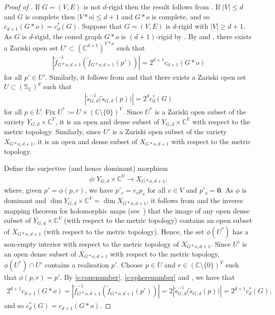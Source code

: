 \begin{proof}[Proof of ]
	If $G=(V,E)$ is not $d$-rigid then the result follows from .
	If $|V| \leq d$ and $G$ is complete then $|V*o| \leq d+1$ and $G*o$ is complete,
	and so $c_{d+1}(G*o) = c^*_d(G)$.
	Suppose that $G=(V,E)$ is $d$-rigid with $|V| \geq d+1$.	
	As $G$ is $d$-rigid, the coned graph $G*o$ is $(d+1)$-rigid by .
	By  and ,
	there exists a Zariski open set $U' \subset (\mathbb{C}^{d+1})^{V*o}$ such that
	\begin{align}\label{e:conenumber}
		\left| \tilde{f}_{G*o,d+1}^{-1} \left(\tilde{f}_{G*o,d+1}(p') \right) \right| = 2^{d+1} c_{d+1}(G*o)
	\end{align}
	for all $p' \in U'$.
	Similarly, it follows from  and  that there exists a Zariski open set $U \subset (\mathbb{S}_\mathbb{C})^{d}$ such that
	\begin{align}\label{e:spherenumber}
		\left| \tilde{s}_{G,d}^{-1} \Big(\tilde{s}_{G,d}(p) \Big) \right| = 2^{d} c_{d}^*(G)
	\end{align}
	for all $p \in U$.
	Fix $U^* := U \times (\mathbb{C} \setminus \{0\})^V$.
	Since $U^*$ is a Zariski open subset of the variety $Y_{G,d} \times \mathbb{C}^V$,
	it is an open and dense subset of $Y_{G,d} \times \mathbb{C}^V$ with respect to the metric topology.
	Similarly,
	since $U'$ is a Zariski open subset of the variety $ X_{G *o,d+1}$,
	it is an open and dense subset of $X_{G *o,d+1}$ with respect to the metric topology.
	
	Define the surjective (and hence dominant) morphism 
	\begin{align*}
		\phi : Y_{G,d} \times \mathbb{C}^V \rightarrow X_{G *o,d+1},
	\end{align*}
	where, given $p'= \phi(p,r)$,
	we have $p'_v=r_vp_v$ for all $v \in V$ and $p'_o=\mathbf{0}$.
	As $\phi$ is dominant and $\dim Y_{G,d} \times \mathbb{C}^V = \dim X_{G *o,d+1}$,
	it follows from  and the inverse mapping theorem for holomorphic maps (see~\cite[Theorem 7.5]{FG02}) that the image of any open dense subset of $Y_{G,d} \times \mathbb{C}^V$ (with respect to the metric topology) contains an open subset of $X_{G*o,d+1}$ (with respect to the metric topology).
	Hence, the set $\phi( U^*)$ has a non-empty interior with respect to the metric topology of $X_{G*o,d+1}$.
	Since $U'$ is an open dense subset of $X_{G*o,d+1}$ with respect to the metric topology,
	$\phi( U^*) \cap U'$ contains a realisation $p'$.
	Choose $p \in U$ and $r \in (\mathbb{C}\setminus \{0\})^V$ such that $\phi(p,r) = p'$.
	By \eqref{e:conenumber}, \eqref{e:spherenumber} and ,
	we have that
	\begin{align*}
		2^{d+1} c_{d+1}(G*o) =\left| \tilde{f}_{G*o,d+1}^{-1}\left(\tilde{f}_{G*o,d+1}(p') \right) \right| = 2 \left| \tilde{s}_{G,d}^{-1}\Big(\tilde{s}_{G,d}(p) \Big) \right|= 2^{d+1} c^*_{d}(G),
	\end{align*}
	and so $c^*_{d}(G) = c_{d+1}(G*o)$.
\end{proof}




